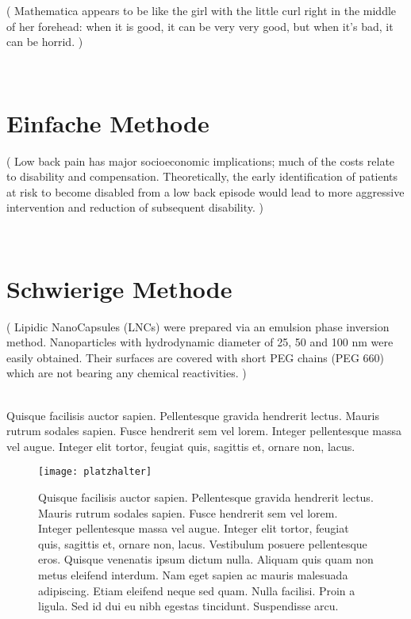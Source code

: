 

\begin{otherlanguage}{english}
(%
 Mathematica appears to be like the girl with the little curl right in the middle of her forehead:
 when it is good, it can be very very good, but when it's bad, it can be horrid.%
)
\end{otherlanguage}
\citep*[p.~12]{Wolfram:91}\\
\lipsum[1-2]
\section{Einfache Methode}
\begin{otherlanguage}{english}
(%
 Low back pain has major socioeconomic implications; 
 much of the costs relate to disability and compensation. 
 Theoretically, the early identification of patients at risk to become disabled from a low back episode 
 would lead to more aggressive intervention and reduction of subsequent disability.%
) 
\end{otherlanguage}
\citep*[Frymouer][p.~36]{Frymoyer:87}\\
\lipsum[1-5]

\section{Schwierige Methode}
\begin{otherlanguage}{english}
(%
 Lipidic NanoCapsules (LNCs) were prepared via an emulsion phase inversion method. 
 Nanoparticles with hydrodynamic diameter of 25, 50 and 100 nm were easily obtained. 
 Their surfaces are covered with short PEG chains (PEG 660) which are not bearing any chemical reactivities. %
) 
\end{otherlanguage}
\citep*[p.~3]{Perrier:11}\\
\lipsum[1-5]
Quisque facilisis auctor sapien. Pellentesque gravida hendrerit lectus. Mauris
rutrum sodales sapien. Fusce hendrerit sem vel lorem. Integer pellentesque massa vel augue. Integer
elit tortor, feugiat quis, sagittis et, ornare non, lacus.
\begin{figure}[h]
\texttt{[image: platzhalter]}
\caption[Quisque facilisis auctor sapien.]
{Quisque facilisis auctor sapien. Pellentesque gravida hendrerit lectus. Mauris
rutrum sodales sapien. Fusce hendrerit sem vel lorem. Integer pellentesque massa vel augue. Integer
elit tortor, feugiat quis, sagittis et, ornare non, lacus. Vestibulum posuere pellentesque eros. Quisque
venenatis ipsum dictum nulla. Aliquam quis quam non metus eleifend interdum. Nam eget sapien
ac mauris malesuada adipiscing. Etiam eleifend neque sed quam. Nulla facilisi. Proin a ligula. Sed
id dui eu nibh egestas tincidunt. Suspendisse arcu.} 
\end{figure}
\lipsum[1-5]
